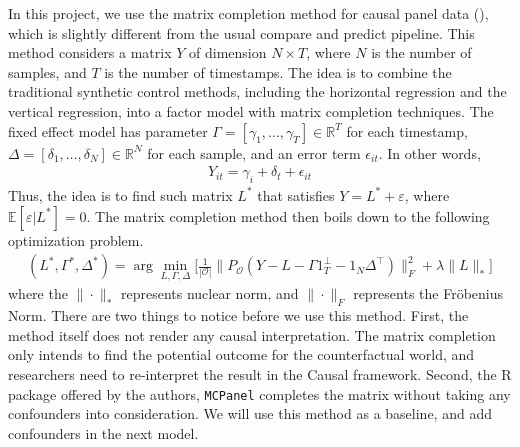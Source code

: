 \documentclass[12pt]{article}
\begin{document}
In this project, we use the matrix completion method for causal panel data (\cite{athey2021matrix}), which is slightly different from the usual compare and predict pipeline. This method considers a matrix $Y$ of dimension $N \times T$, where $N$ is the number of samples, and $T$ is the number of timestamps. The idea is to combine the traditional synthetic control methods, including the horizontal regression and the vertical regression, into a factor model with matrix completion techniques. The fixed effect model has parameter $\Gamma = [\gamma_1, \dots, \gamma_T] \in \mathbb{R}^T$ for each timestamp, $\Delta =[\delta_1, \dots, \delta_N] \in \mathbb{R}^{N}$ for each sample, and an error term $\epsilon_{it}$. In other words,
\begin{align*}
    Y_{it} = \gamma_i + \delta_t + \epsilon_{it}
\end{align*}
Thus, the idea is to find such matrix $L^*$ that satisfies $Y = L^* + \varepsilon$, where $\mathbb{E}[\varepsilon | L^*]=0$. The matrix completion method then boils down to the following optimization problem.
\begin{align}
    \label{eq:noCov}
    (L^* , \Gamma^*, \Delta^*) = \arg\min_{L, \Gamma,\Delta} \bigg[ \frac{1}{|\mathcal{O}|} \|P_\mathcal{O}(Y-L-\Gamma 1_T^\bot -1_N\Delta^\top)\|_F^2+\lambda \|L\|_* \bigg]
\end{align}
where the $\|\cdot\|_*$ represents nuclear norm, and $\|\cdot\|_F$ represents the Fr\"{o}benius Norm.
There are two things to notice before we use this method. First, the method itself does not render any causal interpretation. The matrix completion only intends to find the potential outcome for the counterfactual world, and researchers need to re-interpret the result in the Causal framework. Second, the R package offered by the authors, \texttt{MCPanel} completes the matrix without taking any confounders into consideration. We will use this method as a baseline, and add confounders in the next model.
\end{document}
